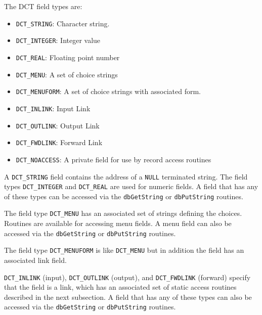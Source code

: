 The DCT field types are:

\begin{itemize}
\item {}\verb|DCT_STRING|: Character string.

\item {}\verb|DCT_INTEGER|: Integer value

\item {}\verb|DCT_REAL|: Floating point number

\item {}\verb|DCT_MENU|: A set of choice strings

\item {}\verb|DCT_MENUFORM|: A set of choice strings with associated form.

\item {}\verb|DCT_INLINK|: Input Link

\item {}\verb|DCT_OUTLINK|: Output Link

\item {}\verb|DCT_FWDLINK|: Forward Link

\item {}\verb|DCT_NOACCESS|: A private field for use by record access routines

\end{itemize}

A \verb|DCT_STRING| field contains the address of a \verb|NULL| terminated string.
The field types \verb|DCT_INTEGER| and \verb|DCT_REAL| are used for numeric fields.
A field that has any of these types can be accessed via the \verb|dbGetString| or \verb|dbPutString| routines.

The field type \verb|DCT_MENU| has an associated set of strings defining the choices.
Routines are available for accessing menu fields.
A menu field can also be accessed via the \verb|dbGetString| or \verb|dbPutString| routines.

The field type \verb|DCT_MENUFORM| is like \verb|DCT_MENU| but in addition the field has an associated link field.

\verb|DCT_INLINK| (input), \verb|DCT_OUTLINK| (output), and \verb|DCT_FWDLINK| (forward) specify that the field is a link, which has an associated set of static access routines described in the next subsection.
A field that has any of these types can also be accessed via the \verb|dbGetString| or \verb|dbPutString| routines.

